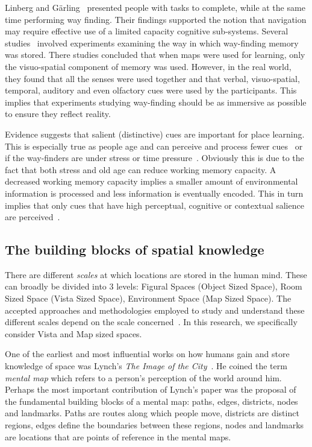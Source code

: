 Linberg and G{\"a}rling~\cite{lindberg1981acquisition} presented people with tasks to complete, while at the same time performing way finding. Their findings supported the notion that navigation may require effective use of a limited capacity cognitive sub-systems. Several studies~\cite{Garden1992, meilinger2008working} involved experiments examining the way in which way-finding memory was stored. There studies concluded that when maps were used for learning, only the visuo-spatial component of memory was used. However, in the real world, they found that all the senses were used together and that verbal, visuo-spatial, temporal, auditory and even olfactory cues were used by the participants. This implies that experiments studying way-finding should be as immersive as possible to ensure they reflect reality.

Evidence suggests that salient (distinctive) cues are important for place learning. This is especially true as people age and can perceive and process fewer cues~\cite{Davis01122009} or if the way-finders are under stress or time pressure~\cite{Ozel:2001tn}. Obviously this is due to the fact that both stress and old age can reduce working memory capacity. A decreased working memory capacity implies a smaller amount of environmental information is processed and less information is eventually encoded. This in turn implies that only cues that have high perceptual, cognitive or contextual salience are perceived~\cite{Davis01122009}.

\subsection{The building blocks of spatial knowledge} %
\label{sub:how_people_gain_spatial_information}

There are different {\em scales} at which locations are stored in the human mind. These can broadly be divided into 3 levels: Figural Spaces (Object Sized Space), Room Sized Space (Vista Sized Space), Environment Space (Map Sized Space). The accepted approaches and methodologies employed to study and understand these different scales depend on the scale concerned~\cite{Sholl:2004vu}. In this research, we specifically consider Vista and Map sized spaces.

One of the earliest and most influential works on how humans gain and store knowledge of space was Lynch's \emph{The Image of the City}~\cite{lynch_image_1960}. He coined the term \emph{mental map} which refers to a person's perception of the world around him. Perhaps the most important contribution of Lynch's paper was the proposal of the fundamental building blocks of a mental map: paths, edges, districts, nodes and landmarks. Paths are routes along which people move, districts are distinct regions, edges define the boundaries between these regions, nodes and landmarks are locations that are points of reference in the mental maps.

